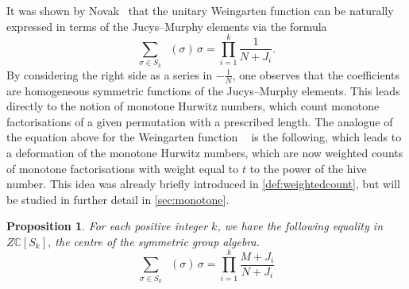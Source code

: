 \documentclass[a4paper]{article}
\theoremstyle{plain}
\newtheorem{proposition}[theorem]{Proposition}
\numberwithin{theorem}{section}
\theoremstyle{definition}
\theoremstyle{remark}
\newcommand{\UM}{\mathbf{U}}			%
\DeclareMathOperator{\UW}{Wg^{\UM}}		%
\newcommand{\SM}{\mathbf{S}}			%
\DeclareMathOperator{\SW}{Wg^{\SM}}		%
\newcommand{\SG}{S} 					%
\begin{document}
It was shown by Novak~\cite{nov10} that the unitary Weingarten function can be naturally expressed in terms of the Jucys--Murphy elements via the formula
\[
\sum_{\sigma \in \SG_k} \UW(\sigma) \, \sigma = \prod_{i = 1}^k \dfrac{1}{N+J_i}.
\]
By considering the right side as a series in $-\frac{1}{N}$, one observes that the coefficients are homogeneous symmetric functions of the Jucys--Murphy elements. This leads directly to the notion of monotone Hurwitz numbers, which count monotone factorisations of a given permutation with a prescribed length. The analogue of the equation above for the Weingarten function $\SW$ is the following, which leads to a deformation of the monotone Hurwitz numbers, which are now weighted counts of monotone factorisations with weight equal to $t$ to the power of the hive number. This idea was already briefly introduced in \cref{def:weightedcount}, but will be studied in further detail in \cref{sec:monotone}.


\begin{proposition} \label{prop:weingartenjucys}
For each positive integer $k$, we have the following equality in $Z\mathbb{C}[\SG_k]$, the centre of the symmetric group algebra.
\[
\sum_{\sigma \in \SG_k} \SW(\sigma) \, \sigma = \prod_{i = 1}^k \dfrac{M+J_i}{N+J_i}
\]
\end{proposition}
\end{document}
